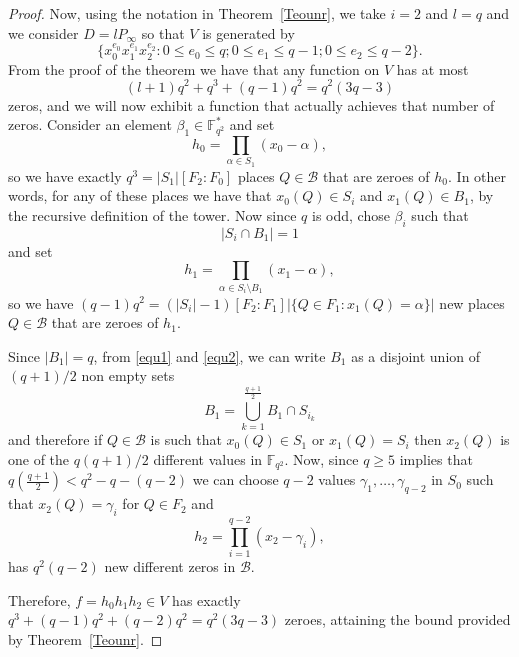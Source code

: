 \documentclass{amsart}
\newcommand{\m}{\mathcal}
\newcommand{\F}{\mathbb{F}}
\theoremstyle{definition}
\begin{document}
\begin{proof}
Now,  using the notation in Theorem~\ref{Teounr}, we take $i=2$ and $l=q$ and we consider $D = lP_{\infty}$ so that $V$ is generated by $$\{x_0^{e_0}x_1^{e_1}x_2^{e_2} : 0 \leq e_0 \leq q; 0 \leq e_1 \leq q-1; 0 \leq e_2 \leq q-2 \}.$$ From the proof of the theorem we have that any function on $V$ has at most $$(l+1)q^2+q^3 + (q-1)q^2=q^2(3q-3)$$ zeros, and we will now exhibit a function that actually achieves that number of zeros.
Consider an element $\beta_1 \in \F_{q^2}^*$ and set $$h_0 = \prod_{\alpha \in S_1}\left( x_0-\alpha \right),$$ so we have exactly $q^3=|S_1|[F_2:F_0]$ places $Q \in \m{B}$ that are zeroes of $h_0$. In other words, for any of these places we have that $x_0(Q) \in S_i$ and  $x_1(Q) \in B_1$, by the recursive definition of the tower. %
Now since $q$ is odd, chose $\beta_i$ such that $$|S_i\cap B_1|= 1$$  and set $$h_1 = \prod_{\alpha \in S_i  \setminus B_1} \left( x_1-\alpha \right),$$ so we have $(q-1)q^2=(|S_i|-1)[F_2:F_1]|\{Q\in F_1: x_1(Q)=\alpha\}|$ new places $Q \in \m{B}$ that are zeroes of $h_1$. %


Since $|B_1|=q$, from \eqref{equ1} and \eqref{equ2}, we can write $B_1$ as a disjoint union of $(q+1)/2$ non empty sets $$B_1=\bigcup_{k=1}^{\frac{q+1}{2}}B_1\cap S_{i_k}$$ and therefore if $Q\in \mathcal{B}$ is such that $x_0(Q)\in S_1$ or $x_1(Q)=S_{i}$ then $x_2(Q)$ is one of the $q(q+1)/2$ different values in $\F_{q^2}$. 
Now, since $q\geq 5$ implies that $q \left( \frac{q+1}{2} \right)< q^2-q-(q-2)$ we can choose $q-2$ values $\gamma_1, \ldots, \gamma_{q-2}$ in $S_0$ such that $x_2(Q)=\gamma_i$ for $Q\in F_2$ and $$h_2 = \prod_{i=1}^{q-2}  \left( x_2-\gamma_i \right),$$ has $q^2(q-2)$ new different zeros in $\mathcal{B}$. 

Therefore, $f = h_0h_1h_2 \in V$ has exactly $q^3+(q-1)q^2 + (q-2)q^2 = q^2(3q-3)$ zeroes, attaining the bound provided by Theorem~\ref{Teounr}. 
\end{proof}
\end{document}
